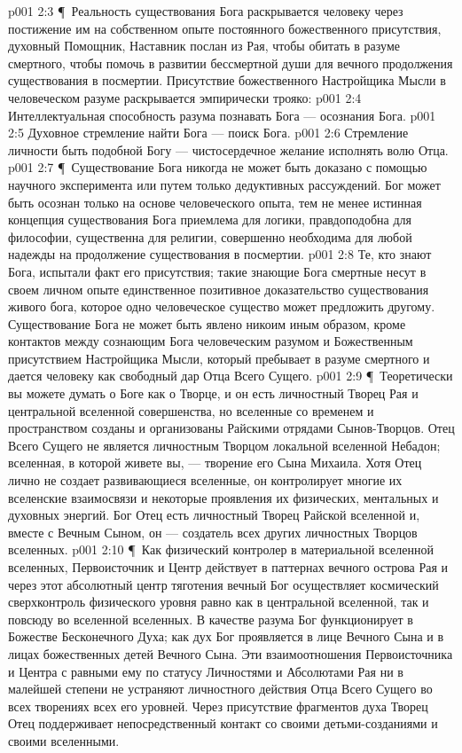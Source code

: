 \vs p001 2:3 \P\ Реальность существования Бога раскрывается человеку через постижение им на собственном опыте постоянного божественного присутствия, духовный Помощник, Наставник послан из Рая, чтобы обитать в разуме смертного, чтобы помочь в развитии бессмертной души для вечного продолжения существования в посмертии. Присутствие божественного Настройщика Мысли в человеческом разуме раскрывается эмпирически трояко:
\vs p001 2:4 \bibnobreakspace Интеллектуальная способность разума познавать Бога --- осознания Бога.
\vs p001 2:5 \bibnobreakspace Духовное стремление найти Бога --- поиск Бога.
\vs p001 2:6 \bibnobreakspace Стремление личности быть подобной Богу --- чистосердечное желание исполнять волю Отца.
\vs p001 2:7 \P\ Существование Бога никогда не может быть доказано с помощью научного эксперимента или путем только дедуктивных рассуждений. Бог может быть осознан только на основе человеческого опыта, тем не менее истинная концепция существования Бога приемлема для логики, правдоподобна для философии, существенна для религии, совершенно необходима для любой надежды на продолжение существования в посмертии.
\vs p001 2:8 Те, кто знают Бога, испытали факт его присутствия; такие знающие Бога смертные несут в своем личном опыте единственное позитивное доказательство существования живого бога, которое одно человеческое существо может предложить другому. Существование Бога не может быть явлено никоим иным образом, кроме контактов между сознающим Бога человеческим разумом и Божественным присутствием Настройщика Мысли, который пребывает в разуме смертного и дается человеку как свободный дар Отца Всего Сущего.
\vs p001 2:9 \P\ Теоретически вы можете думать о Боге как о Творце, и он есть личностный Творец Рая и центральной вселенной совершенства, но вселенные со временем и пространством созданы и организованы Райскими отрядами Сынов\hyp{}Творцов. Отец Всего Сущего не является личностным Творцом локальной вселенной Небадон; вселенная, в которой живете вы, --- творение его Сына Михаила. Хотя Отец лично не создает развивающиеся вселенные, он контролирует многие их вселенские взаимосвязи и некоторые проявления их физических, ментальных и духовных энергий. Бог Отец есть личностный Творец Райской вселенной и, вместе с Вечным Сыном, он --- создатель всех других личностных Творцов вселенных.
\vs p001 2:10 \P\ Как физический контролер в материальной вселенной вселенных, Первоисточник и Центр действует в паттернах вечного острова Рая и через этот абсолютный центр тяготения вечный Бог осуществляет космический сверхконтроль физического уровня равно как в центральной вселенной, так и повсюду во вселенной вселенных. В качестве разума Бог функционирует в Божестве Бесконечного Духа; как дух Бог проявляется в лице Вечного Сына и в лицах божественных детей Вечного Сына. Эти взаимоотношения Первоисточника и Центра с равными ему по статусу Личностями и Абсолютами Рая ни в малейшей степени не устраняют  личностного действия Отца Всего Сущего во всех творениях всех его уровней. Через присутствие фрагментов духа Творец Отец поддерживает непосредственный контакт со своими детьми\hyp{}созданиями и своими вселенными.
